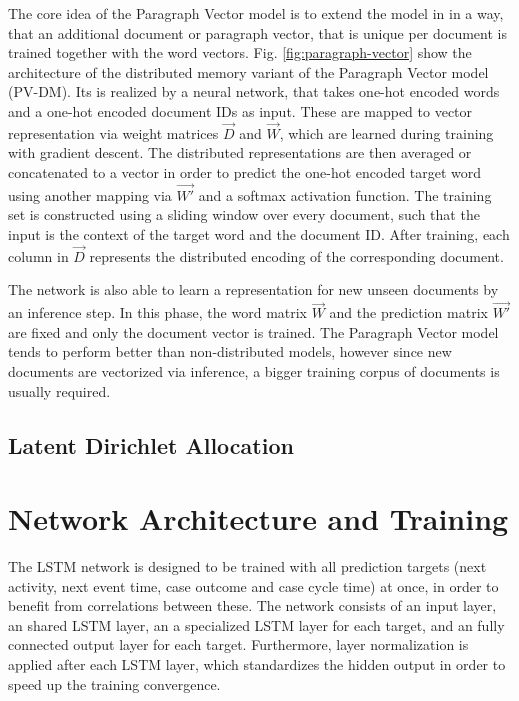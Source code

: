 The core idea of the Paragraph Vector model is to extend the model in \cite{DBLP:journals/jmlr/BengioDVJ03} in a way, that an additional document or paragraph vector, that is unique per document is trained together with the word vectors.
Fig. \ref{fig:paragraph-vector} show the architecture of the distributed memory variant of the Paragraph Vector model (PV-DM).
Its is realized by a neural network, that takes one-hot encoded words and a one-hot encoded document IDs as input.
These are mapped to vector representation via weight matrices $\vec{D}$ and $\vec{W}$, which are learned during training with gradient descent.
The distributed representations are then averaged or concatenated to a vector in order to predict the one-hot encoded target word using another mapping via $\vec{W'}$ and a softmax activation function.
The training set is constructed using a sliding window over every document, such that the input is the context of the target word and the document ID.
After training, each column in $\vec{D}$ represents the distributed encoding of the corresponding document.

The network is also able to learn a representation for new unseen documents by an inference step.
In this phase, the word matrix $\vec{W}$ and the prediction matrix $\vec{W'}$ are fixed and only the document vector is trained.
The Paragraph Vector model tends to perform better than non-distributed models, however since new documents are vectorized via inference, a bigger training corpus of documents is usually required.



\subsection{Latent Dirichlet Allocation}

\section{Network Architecture and Training}

The LSTM network is designed to be trained with all prediction targets (next activity, next event time, case outcome and case cycle time) at once, in order to benefit from correlations between these.
The network consists of an input layer, an shared LSTM layer, an a specialized LSTM layer for each target, and an fully connected output layer for each target.
Furthermore, layer normalization \cite{DBLP:journals/corr/BaKH16} is applied after each LSTM layer, which standardizes the hidden output in order to speed up the training convergence.

